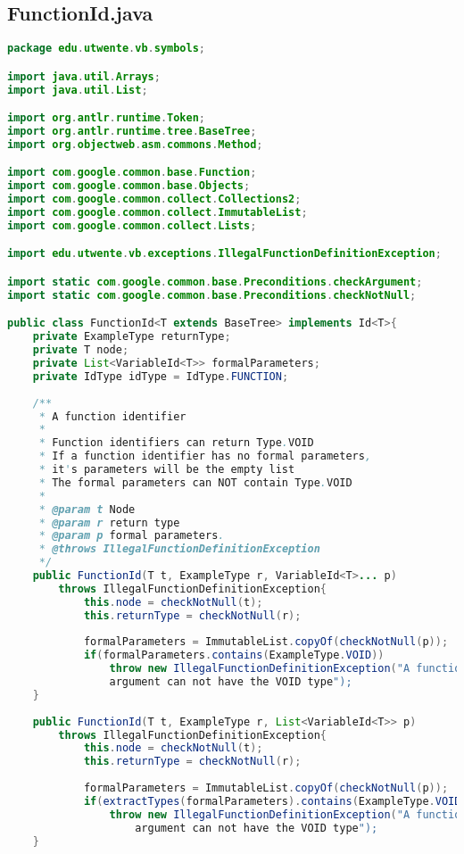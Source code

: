 \subsection{FunctionId.java}
\begin{lstlisting}[language=Java]
package edu.utwente.vb.symbols;

import java.util.Arrays;
import java.util.List;

import org.antlr.runtime.Token;
import org.antlr.runtime.tree.BaseTree;
import org.objectweb.asm.commons.Method;

import com.google.common.base.Function;
import com.google.common.base.Objects;
import com.google.common.collect.Collections2;
import com.google.common.collect.ImmutableList;
import com.google.common.collect.Lists;

import edu.utwente.vb.exceptions.IllegalFunctionDefinitionException;

import static com.google.common.base.Preconditions.checkArgument;
import static com.google.common.base.Preconditions.checkNotNull;

public class FunctionId<T extends BaseTree> implements Id<T>{
	private ExampleType returnType;
	private T node;
	private List<VariableId<T>> formalParameters;
	private IdType idType = IdType.FUNCTION;
	
	/**
	 * A function identifier
	 * 
	 * Function identifiers can return Type.VOID
	 * If a function identifier has no formal parameters, 
     * it's parameters will be the empty list
	 * The formal parameters can NOT contain Type.VOID
	 * 
	 * @param t Node
	 * @param r return type
	 * @param p formal parameters.
	 * @throws IllegalFunctionDefinitionException 
	 */
	public FunctionId(T t, ExampleType r, VariableId<T>... p) 
        throws IllegalFunctionDefinitionException{
    		this.node = checkNotNull(t);
    		this.returnType = checkNotNull(r);
		
    		formalParameters = ImmutableList.copyOf(checkNotNull(p));
    		if(formalParameters.contains(ExampleType.VOID))
    			throw new IllegalFunctionDefinitionException("A function 
                argument can not have the VOID type");
	}
	
	public FunctionId(T t, ExampleType r, List<VariableId<T>> p) 
        throws IllegalFunctionDefinitionException{
    		this.node = checkNotNull(t);
    		this.returnType = checkNotNull(r);
		
    		formalParameters = ImmutableList.copyOf(checkNotNull(p));
    		if(extractTypes(formalParameters).contains(ExampleType.VOID))
    			throw new IllegalFunctionDefinitionException("A function 
                    argument can not have the VOID type");
	}
	

\end{lstlisting}
